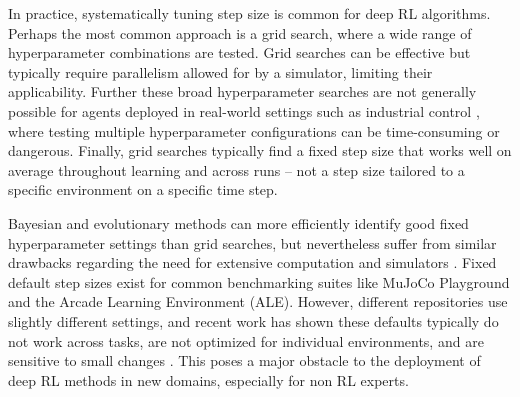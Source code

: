 
In practice, systematically tuning step size is common for deep RL algorithms. Perhaps the most common approach is a grid search, where a wide range of hyperparameter combinations are tested. Grid searches can be effective but typically require parallelism allowed for by a simulator, limiting their applicability. Further these broad hyperparameter searches are not generally possible for agents deployed in real-world settings such as industrial control \cite{luo2022controlling,janjua2024gvfs}, where testing multiple
hyperparameter configurations can be time-consuming or dangerous. Finally, grid searches typically find a fixed step size that works well on average throughout learning and across runs -- not a step size tailored to a specific environment on a specific time step.

Bayesian and evolutionary methods can more efficiently identify good fixed hyperparameter settings than grid searches, but nevertheless suffer from similar drawbacks regarding the need for extensive computation and simulators \cite{parker2022automated}. Fixed default step sizes exist for common benchmarking suites like MuJoCo Playground and the Arcade Learning Environment (ALE). 
However, different repositories use slightly different settings, and recent work has shown these
defaults typically do not work across tasks, are not optimized for individual environments, and are sensitive to
small changes \cite{patterson2024chtb,adkins2024method,eimer2023hyperparameters}.
This poses a major obstacle to the deployment of deep RL methods in new domains, especially for non RL experts.

